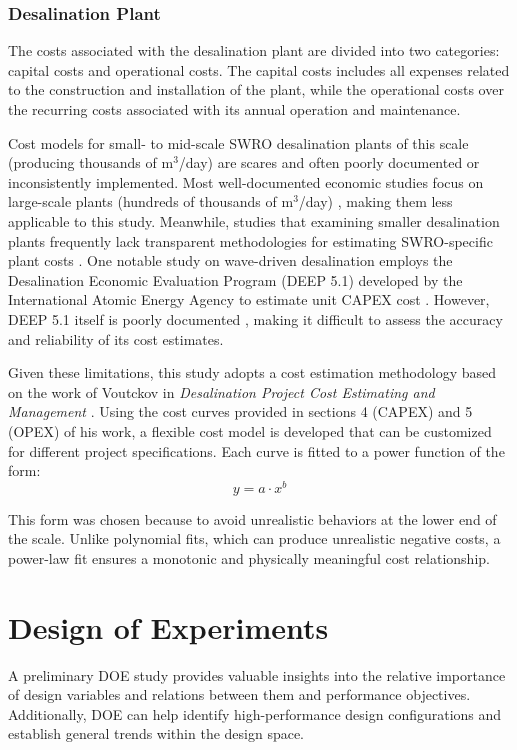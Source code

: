 \documentclass[twocolumn,10pt]{asme2e}
\begin{document}
\subsubsection{Desalination Plant}
The costs associated with the desalination plant are divided into two categories: capital costs and operational costs. The capital costs includes all expenses related to the construction and installation of the plant, while the operational costs over the recurring costs associated with its annual operation and maintenance.

Cost models for small- to mid-scale SWRO desalination plants of this scale (producing thousands of m$^3$/day) are scares and often poorly documented or inconsistently implemented. Most well-documented economic studies focus on large-scale plants (hundreds of thousands of m$^3$/day) \cite{Slocum2016,Haefner2023,roopexcurve,Wittholz2008}, making them less applicable to this study. Meanwhile, studies that examining smaller desalination plants frequently lack transparent methodologies for estimating SWRO-specific plant costs \cite{Elkadeem2024,Goekcek2016}. One notable study on wave-driven desalination employs the Desalination Economic Evaluation Program (DEEP 5.1) developed by the International Atomic Energy Agency to estimate unit CAPEX cost \cite{Yu2022}. However, DEEP 5.1 itself is poorly documented \cite{DEEP5manual}, making it difficult to assess the accuracy and reliability of its cost estimates. 

Given these limitations, this study adopts a cost estimation methodology based on the work of Voutckov in \emph{Desalination Project Cost Estimating and Management} \cite{voutch}. Using the cost curves provided in sections 4 (CAPEX) and 5 (OPEX) of his work, a flexible cost model is developed that can be customized for different project specifications. Each curve is fitted to a power function of the form:
\begin{equation}
    y = a \cdot x^b
\end{equation}

This form was chosen because to avoid unrealistic behaviors at the lower end of the scale. Unlike polynomial fits, which can produce unrealistic negative costs, a power-law fit ensures a monotonic and physically meaningful cost relationship.

\section{Design of Experiments}
A preliminary DOE study provides valuable insights into the relative importance of design variables and relations between them and performance objectives. Additionally, DOE can help identify high-performance design configurations and establish general trends within the design space. 
\end{document}

